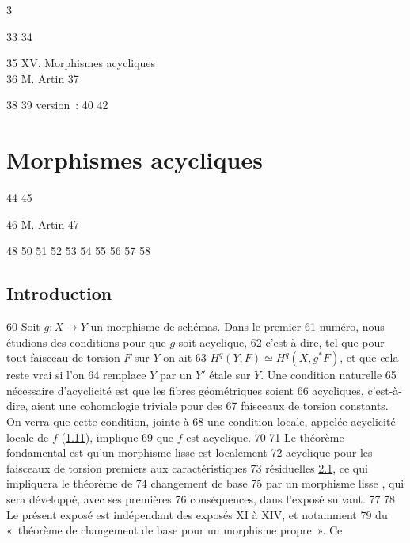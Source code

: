 3	\documentclass[10pt]{../fichiers-configuration-latex/smfart}
\begin{document}
    33	
    34	\begin{center}
    35	XV. Morphismes acycliques\\
    36	M. Artin 
    37	\end{center}
    38	
    39	version : \showgitstatus{}
    40		
    42		\chapter{Morphismes acycliques}
    44	%
    45	\begin{center}
    46	M. Artin 
    47	\end{center}
    48		
    50	\setcounter{pageoriginal}{167}
    51	
    52	%
    53	%
    54	%
    55	%
    56	%
    57	
    58	\section*{Introduction}	
    60	Soit $g:X\rightarrow Y$ un morphisme de schémas. Dans le premier
    61	numéro, nous étudions des conditions pour que $g$ soit acyclique,
    62	c'est-à-dire, tel que pour tout faisceau de torsion $F$ sur $Y$ on ait
    63	$H^{q}(Y,F)\simeq H^{q}(X,g^{\ast}F)$, et que cela reste vrai si l'on
    64	remplace $Y$ par un $Y'$ étale sur $Y$. Une condition naturelle
    65	nécessaire d'acyclicité est que les fibres géométriques soient
    66	acycliques, c'est-à-dire, aient une cohomologie triviale pour des
    67	faisceaux de torsion constants. On verra que cette condition, jointe à
    68	une condition locale, appelée acyclicité locale de $f$ (\hyperref[XV.def1.11]{1.11}), implique
    69	que $f$ est acyclique.
    70	
    71	Le théorème fondamental est qu'un morphisme lisse est localement
    72	acyclique pour les faisceaux de torsion premiers aux caractéristiques
    73	résiduelles \hyperref[XV.thm2.1]{2.1}, ce qui impliquera le théorème de
    74	changement de base 
    75	par un morphisme lisse , qui sera développé, avec ses premières
    76	conséquences, dans l'exposé suivant.
    77	
    78	Le présent exposé est indépendant des exposés XI à XIV, et notamment
    79	du « théorème de changement de base pour un morphisme propre ». Ce
\end{document}

